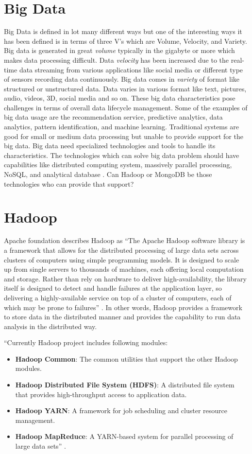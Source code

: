 \documentclass[sigconf]{acmart}
\begin{document}
\section{Big Data}
Big Data is defined in lot many different ways but one of the interesting ways it has been defined is in terms of three V's which are Volume, Velocity, and Variety. Big data is generated in great \emph{volume} typically in the gigabyte or more which makes data processing difficult. Data \emph{velocity} has been increased due to the real-time data streaming from various applications like social media or different type of sensors recording data continuously. Big data comes in \emph{variety} of format like structured or unstructured data. Data varies in various format like text, pictures, audio, videos, 3D, social media and so on. These big data characteristics pose challenges in terms of overall data lifecycle management. Some of the examples of big data usage are the recommendation service, predictive analytics, data analytics, pattern identification, and machine learning. Traditional systems are good for small or medium data processing but unable to provide support for the big data. Big data need specialized technologies and tools to handle its characteristics. The technologies which can solve big data problem should have capabilities like distributed computing system, massively parallel processing, NoSQL, and analytical database \cite[Ch.\ 1, p. 4]{AchariShiva2015HE}. Can Hadoop or MongoDB be those technologies who can provide that support?  

\section{Hadoop}
Apache foundation describes Hadoop as ``The Apache Hadoop software library is a framework that allows for the distributed processing of large data sets across clusters of computers using simple programming models. It is designed to scale up from single servers to thousands of machines, each offering local computation and storage. Rather than rely on hardware to deliver high-availability, the library itself is designed to detect and handle failures at the application layer, so delivering a highly-available service on top of a cluster of computers, each of which may be prone to failures'' \cite{www-hadoop}. In other words, Hadoop provides a framework to store data in the distributed manner and provides the capability to run data analysis in the distributed way.

``Currently Hadoop project includes following modules:
\begin{itemize}
\item {\bf Hadoop Common}: The common utilities that support the other Hadoop modules.
\item {\bf Hadoop Distributed File System (HDFS)}: A distributed file system that provides high-throughput access to application data.
\item {\bf Hadoop YARN}: A framework for job scheduling and cluster resource management.
\item {\bf Hadoop MapReduce}: A YARN-based system for parallel processing of large data sets'' \cite{www-hadoop}.
\end{itemize}
\end{document}
